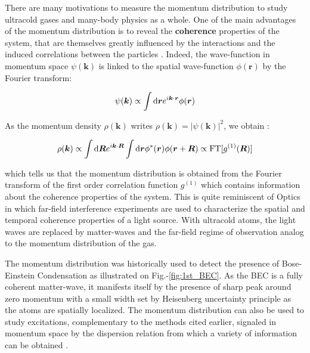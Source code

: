 
There are many motivations to measure the momentum distribution to study ultracold gases and many-body physics as a whole. One of the main advantages of the momentum distribution is to reveal the \textbf{coherence} properties of the system, that are themselves greatly influenced by the interactions and the induced correlations between the particles \cite{greiner2002quantum}. Indeed, the wave-function in momentum space $\psi(\bm{k})$ is linked to the spatial wave-function $\phi(\bm{r})$ by the Fourier transform:

\begin{equation}
    \psi(\bm{k}) \propto \int {\rm d}\bm{r} e^{i \bm{k} \cdot \bm{r}} \phi(\bm{r})
\end{equation}

\noindent As the momentum density $\rho(\bm{k})$ writes $\rho(\bm{k})= |\psi(\bm{k})|^2$, we obtain \cite{pitaevskii2016bose}:

\begin{equation}
    \rho(\bm{k}) \propto \int {\rm d}\bm{R} e^{i \bm{k} \cdot \bm{R}} \int {\rm d}\bm{r} \phi^* (\bm{r}) \phi(\bm{r}+\bm{R}) \propto \text{FT} [g^{(1)} (\bm{R})]
\end{equation}

\noindent which tells us that the momentum distribution is obtained from the Fourier transform of the first order correlation function $g^{(1)}$ which contains information about the coherence properties of the system.
This is quite reminiscent of Optics in which far-field interference experiments are used to characterize the spatial and temporal coherence properties of a light source. With ultracold atoms, the light waves are replaced by matter-waves and the far-field regime of observation analog to the momentum distribution of the gas.

The momentum distribution was historically \cite{anderson1995observation} used to detect the presence of Bose-Einstein Condensation as illustrated on Fig.-\ref{fig:1st_BEC}. As the BEC is a fully coherent matter-wave, it manifests itself by the presence of sharp peak around zero momentum with a small width set by Heisenberg uncertainty principle as the atoms are spatially localized. The momentum distribution can also be used to study excitations, complementary to the methods cited earlier, signaled in momentum space by the dispersion relation from which a variety of information can be obtained \cite{clement2009exploring,ozeri2005colloquium,sagi2012measurement}.


